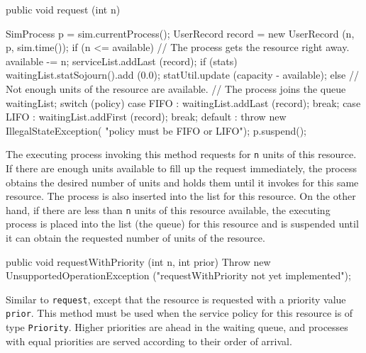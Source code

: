 \begin{code}

   public void request (int n) \begin{hide} {
        SimProcess p = sim.currentProcess();
        UserRecord record = new UserRecord (n, p, sim.time());
        if (n <= available) {
            // The process gets the resource right away.
            available -= n;
            serviceList.addLast (record);
            if (stats) {
               waitingList.statSojourn().add (0.0);
               statUtil.update (capacity - available);
            }
        }
        else {
            // Not enough units of the resource are available.
            // The process joins the queue waitingList;
            switch (policy) {
                case FIFO : waitingList.addLast (record); break;
                case LIFO : waitingList.addFirst (record); break;
                default   : throw new IllegalStateException(
                                                "policy must be FIFO or LIFO");
            }
            p.suspend();
        }
   }\end{hide}
\end{code}
\begin{tabb}  The executing process invoking this method requests for
   \texttt{n} units of this resource.  If there are enough units available
   to fill up the request immediately, the process obtains the desired
   number of units and holds them until it invokes 
   for this same resource.  The process is also inserted into the 
    list for this resource.
   On the other hand, if there are less than \texttt{n} units of this
   resource available, the executing process is placed into the 
    list (the queue) for this resource and is suspended
   until it can obtain the requested number of units of the resource.
\end{tabb}
\begin{htmlonly}
\end{htmlonly}
\iffalse  %
   public void requestWithPriority (int n, int prior) {
      Throw new UnsupportedOperationException 
                ("requestWithPriority not yet implemented");
   }
\begin{tabb}  Similar to \texttt{request}, except that the resource is requested
   with a priority value \texttt{prior}.  This method must be used when the
   service policy for this resource is of type \texttt{Priority}.
   Higher priorities are ahead in the waiting queue, and processes with
   equal priorities are served according to their order of arrival.
\end{tabb}
